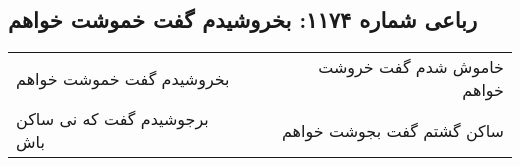 \begin{center}
\section*{رباعی شماره ۱۱۷۴: بخروشیدم گفت خموشت خواهم}
\label{sec:1174}
\begin{longtable}{l p{0.5cm} r}
بخروشیدم گفت خموشت خواهم
&&
خاموش شدم گفت خروشت خواهم
\\
برجوشیدم گفت که نی ساکن باش
&&
ساکن گشتم گفت بجوشت خواهم
\\
\end{longtable}
\end{center}
